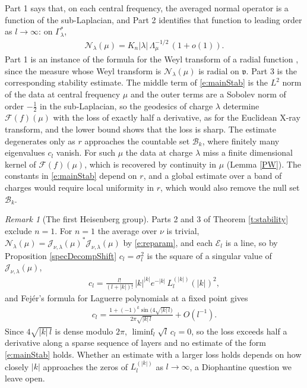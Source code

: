 \documentclass[11pt]{amsart}
\theoremstyle{plain}
\theoremstyle{definition}
\theoremstyle{remark}
\newtheorem{remark}[theorem]{Remark}
\numberwithin{equation}{section}
\def\fv{\mathfrak{v}}
\def\cB{\mathcal{B}}
\def\cE{\mathcal{E}}
\def\cN{\mathcal{N}}
\def\cJ{\mathcal{J}}
\def\cF{\mathcal{F}}
\numberwithin{equation}{section}
\begin{document}
Part 1 says that, on each central frequency, the averaged normal operator is a function of the sub-Laplacian, and Part 2 identifies that function to leading order as $l\to\infty$: on $\Gamma_\lambda^*$,
\begin{align*}
	\cN_\lambda(\mu)=K_n|\lambda|\,\Lambda_\mu^{-1/2}\,(1+o(1)).
\end{align*}
 Part 1 is an instance of the formula for the Weyl transform of a radial function \cite[Theorem 1.4.3]{thangaveluHarmonicAnalysisHeisenberg1998}, since the measure whose Weyl transform is $\cN_\lambda(\mu)$ is radial on $\fv$. Part 3 is the corresponding stability estimate. The middle term of \eqref{e:mainStab} is the $L^2$ norm of the data at central frequency $\mu$ and the outer terms are a Sobolev norm of order $-\tfrac12$ in the sub-Laplacian, so the geodesics of charge $\lambda$ determine $\cF(f)(\mu)$ with the loss of exactly half a derivative, as for the Euclidean X-ray transform, and the lower bound shows that the loss is sharp.  The estimate degenerates only as $r$ approaches the countable set $\cB_k$, where finitely many eigenvalues $c_l$ vanish. For such $\mu$ the data at charge $\lambda$ miss a finite dimensional kernel of $\cF(f)(\mu)$, which is recovered by continuity in $\mu$ (Lemma \ref{PW}). The constants in \eqref{e:mainStab} depend on $r$, and a global estimate over a band of charges would require local uniformity in $r$, which would also remove the null set $\cB_k$.

\begin{remark}[The first Heisenberg group]\label{r:nOne}
	Parts 2 and 3 of Theorem \ref{t:stability} exclude $n=1$. For $n=1$ the average over $\nu$ is trivial, $\cN_\lambda(\mu)=\cJ_{\nu, \lambda}(\mu)^*\cJ_{\nu, \lambda}(\mu)$ by \eqref{e:reparam}, and each $\cE_l$ is a line, so by Proposition \ref{specDecompShift} $c_l=\sigma_l^2$ is the square of a singular value of $\cJ_{\nu, \lambda}(\mu)$,
	\begin{align*}
		c_l=\frac{l!}{(l+|k|)!}\,|k|^{|k|}e^{-|k|}\,L_l^{(|k|)}(|k|)^2,
	\end{align*}
	and Fej\'er's formula for Laguerre polynomials at a fixed point \cite[Theorem 8.22.1]{szegoOrthogonalPolynomials1975} gives
	\begin{align*}
		c_l=\frac{1+(-1)^k\sin\big(4\sqrt{|k|\,l}\big)}{2\pi\sqrt{|k|\,l}}+O(l^{-1}).
	\end{align*}
	Since $4\sqrt{|k|\,l}$ is dense modulo $2\pi$, $\liminf_l\sqrt{l}\,c_l=0$, so the loss exceeds half a derivative along a sparse sequence of layers and no estimate of the form \eqref{e:mainStab} holds. Whether an estimate with a larger loss holds depends on how closely $|k|$ approaches the zeros of $L_l^{(|k|)}$ as $l\to\infty$, a Diophantine question we leave open.
\end{remark}
\end{document}

